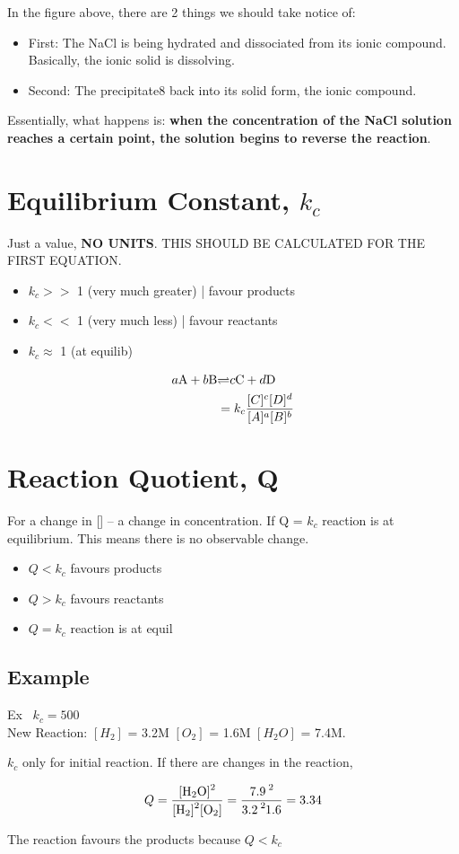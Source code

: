 \documentclass{article}
\begin{document}
In the figure above, there are 2 things we should take notice of:
\begin{itemize}
\item First: The NaCl is being hydrated and dissociated from its ionic compound. Basically, the ionic solid is dissolving.
\item Second: The  precipitate8 back into its solid form, the  ionic compound.
\end{itemize}
Essentially, what happens is: \textbf{when the concentration of the NaCl solution reaches a certain point, the solution begins to reverse the reaction}.

\pagebreak

\section{Equilibrium Constant, $k_{c}$}
Just a value, \textbf{NO UNITS}. THIS SHOULD BE CALCULATED FOR THE FIRST EQUATION.

\begin{itemize}
\item $k_{c} >>$ 1 (very much greater) | favour products
\item $k_{c} <<$ 1 (very much less) | favour reactants
\item $k_{c} \approx $  1 (at equilib)
\end{itemize}

\begin{align*}
a\ce{A} + b\ce{B} &\ce{\rightleftharpoons} c\ce{C} + d\ce{D}\\
&= k_{c}\frac{[C]^{c}[D]^{d}}{[A]^{a}[B]^{b}}
\end{align*}

\section{Reaction Quotient, Q}
For a change in [] -- a change in concentration. If Q = $k_{c}$ reaction is at equilibrium. This means there is no observable change.

\begin{itemize}
\item $Q<k_{c}$ favours products
\item $Q>k_{c}$ favours reactants
\item $Q=k_{c}$ reaction is at equil
\end{itemize}

\subsection{Example}
Ex \ $k_{c} = 500$\\New Reaction: $[H_{2}]$ = 3.2M $[O_{2}]$ = 1.6M $[H_{2}O]$ = 7.4M.

$k_{c}$ only for initial reaction. If there are changes in the reaction, 

$$ Q = \ce{\frac{[H2O]^{2}}{[H2]^{2}[O2]}} = \ce{\frac{7.9^{2}}{3.2^{2}{1.6}}} = 3.34$$

The reaction favours the products because $Q < k_{c}$


\end{document}
